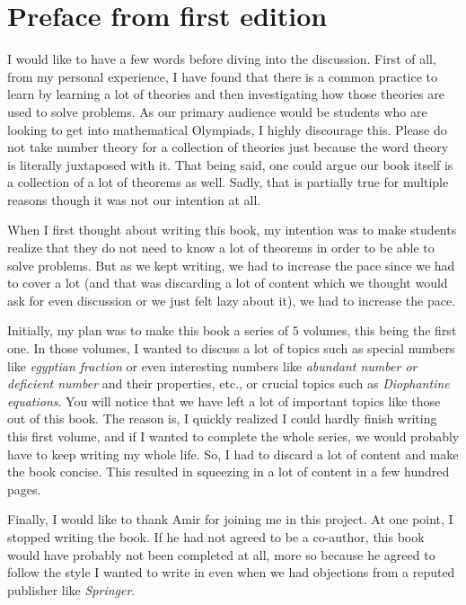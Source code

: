 \documentclass[leqno,12pt]{book}
\begin{document}
\newpage
\section*{Preface from first edition}

I would like to have a few words before diving into the discussion. First of all, from my personal experience, I have found that there is a common practice to learn by learning a lot of theories and then investigating how those theories are used to solve problems. As our primary audience would be students who are looking to get into mathematical Olympiads, I highly discourage this. Please do not take number theory for a collection of theories just because the word theory is literally juxtaposed with it. That being said, one could argue our book itself is a collection of a lot of theorems as well. Sadly, that is partially true for multiple reasons though it was not our intention at all.


When I first thought about writing this book, my intention was to make students realize that they do not need to know a lot of theorems in order to be able to solve problems. But as we kept writing, we had to increase the pace since we had to cover a lot (and that was discarding a lot of content which we thought would ask for even discussion or we just felt lazy about it), we had to increase the pace.


Initially, my plan was to make this book a series of $5$ volumes, this being the first one. In those volumes, I wanted to discuss a lot of topics such as special numbers like \textit{egyptian fraction} or even interesting numbers like \textit{abundant number or deficient number} and their properties, etc., or crucial topics such as \textit{Diophantine equations}. You will notice that we have left a lot of important topics like those out of this book. The reason is, I quickly realized I could hardly finish writing this first volume, and if I wanted to complete the whole series, we would probably have to keep writing my whole life. So, I had to discard a lot of content and make the book concise. This resulted in squeezing in a lot of content in a few hundred pages.


Finally, I would like to thank Amir for joining me in this project. At one point, I stopped writing the book. If he had not agreed to be a co-author, this book would have probably not been completed at all, more so because he agreed to follow the style I wanted to write in even when we had objections from a reputed publisher like \textit{Springer}.
\end{document}
